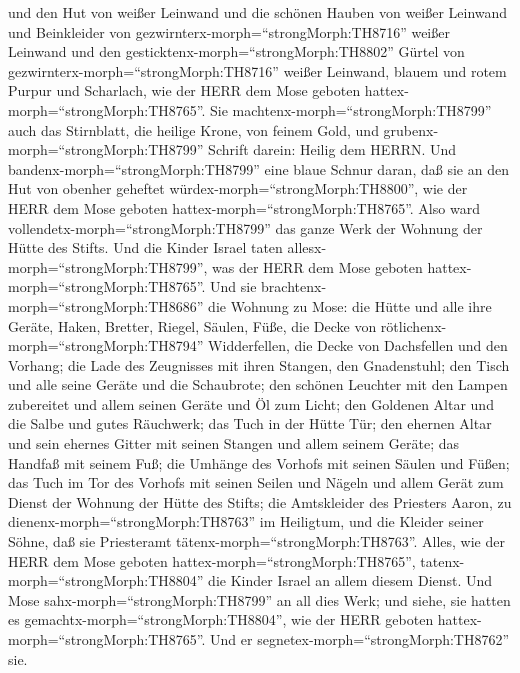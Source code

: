  und den Hut von weißer Leinwand und die schönen Hauben von
weißer Leinwand und Beinkleider von
gezwirnterx-morph=``strongMorph:TH8716'' weißer Leinwand 
und den gesticktenx-morph=``strongMorph:TH8802'' Gürtel von
gezwirnterx-morph=``strongMorph:TH8716'' weißer Leinwand, blauem und
rotem Purpur und Scharlach, wie der HERR dem Mose geboten
hattex-morph=``strongMorph:TH8765''.  Sie
machtenx-morph=``strongMorph:TH8799'' auch das Stirnblatt, die heilige
Krone, von feinem Gold, und grubenx-morph=``strongMorph:TH8799'' Schrift
darein: Heilig dem HERRN.  Und
bandenx-morph=``strongMorph:TH8799'' eine blaue Schnur daran, daß sie an
den Hut von obenher geheftet würdex-morph=``strongMorph:TH8800'', wie
der HERR dem Mose geboten hattex-morph=``strongMorph:TH8765''.
 Also ward vollendetx-morph=``strongMorph:TH8799'' das
ganze Werk der Wohnung der Hütte des Stifts. Und die Kinder Israel taten
allesx-morph=``strongMorph:TH8799'', was der HERR dem Mose geboten
hattex-morph=``strongMorph:TH8765''.  Und sie
brachtenx-morph=``strongMorph:TH8686'' die Wohnung zu Mose: die Hütte
und alle ihre Geräte, Haken, Bretter, Riegel, Säulen, Füße,
 die Decke von rötlichenx-morph=``strongMorph:TH8794''
Widderfellen, die Decke von Dachsfellen und den Vorhang; 
die Lade des Zeugnisses mit ihren Stangen, den Gnadenstuhl;
 den Tisch und alle seine Geräte und die Schaubrote;
 den schönen Leuchter mit den Lampen zubereitet und allem
seinen Geräte und Öl zum Licht;  den Goldenen Altar und die
Salbe und gutes Räuchwerk; das Tuch in der Hütte Tür;  den
ehernen Altar und sein ehernes Gitter mit seinen Stangen und allem
seinem Geräte; das Handfaß mit seinem Fuß;  die Umhänge des
Vorhofs mit seinen Säulen und Füßen; das Tuch im Tor des Vorhofs mit
seinen Seilen und Nägeln und allem Gerät zum Dienst der Wohnung der
Hütte des Stifts;  die Amtskleider des Priesters Aaron, zu
dienenx-morph=``strongMorph:TH8763'' im Heiligtum, und die Kleider
seiner Söhne, daß sie Priesteramt tätenx-morph=``strongMorph:TH8763''.
 Alles, wie der HERR dem Mose geboten
hattex-morph=``strongMorph:TH8765'', tatenx-morph=``strongMorph:TH8804''
die Kinder Israel an allem diesem Dienst.  Und Mose
sahx-morph=``strongMorph:TH8799'' an all dies Werk; und siehe, sie
hatten es gemachtx-morph=``strongMorph:TH8804'', wie der HERR geboten
hattex-morph=``strongMorph:TH8765''. Und er
segnetex-morph=``strongMorph:TH8762'' sie.

